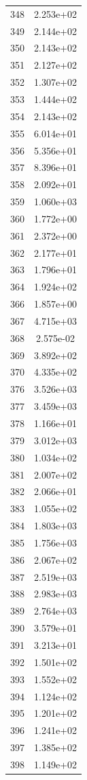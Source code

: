 \documentclass[12pt]{article}
\begin{document}
\begin{longtable}{@{}cc@{}}
348 & 2.253e+02 \\
349 & 2.144e+02 \\
350 & 2.143e+02 \\
351 & 2.127e+02 \\
352 & 1.307e+02 \\
353 & 1.444e+02 \\
354 & 2.143e+02 \\
355 & 6.014e+01 \\
356 & 5.356e+01 \\
357 & 8.396e+01 \\
358 & 2.092e+01 \\
359 & 1.060e+03 \\
360 & 1.772e+00 \\
361 & 2.372e+00 \\
362 & 2.177e+01 \\
363 & 1.796e+01 \\
364 & 1.924e+02 \\
366 & 1.857e+00 \\
367 & 4.715e+03 \\
368 & 2.575e-02 \\
369 & 3.892e+02 \\
370 & 4.335e+02 \\
376 & 3.526e+03 \\
377 & 3.459e+03 \\
378 & 1.166e+01 \\
379 & 3.012e+03 \\
380 & 1.034e+02 \\
381 & 2.007e+02 \\
382 & 2.066e+01 \\
383 & 1.055e+02 \\
384 & 1.803e+03 \\
385 & 1.756e+03 \\
386 & 2.067e+02 \\
387 & 2.519e+03 \\
388 & 2.983e+03 \\
389 & 2.764e+03 \\
390 & 3.579e+01 \\
391 & 3.213e+01 \\
392 & 1.501e+02 \\
393 & 1.552e+02 \\
394 & 1.124e+02 \\
395 & 1.201e+02 \\
396 & 1.241e+02 \\
397 & 1.385e+02 \\
398 & 1.149e+02 \\

\end{longtable}
\end{document}
